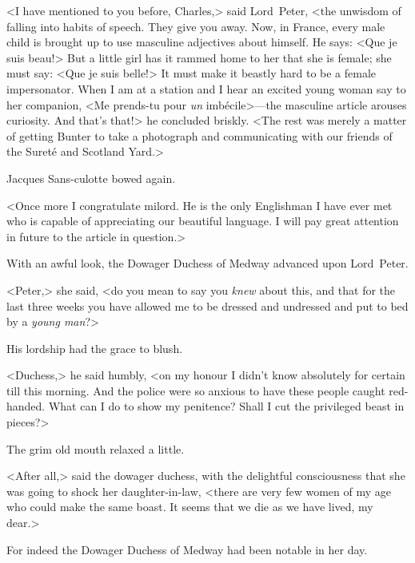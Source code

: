<I have mentioned to you before, Charles,> said Lord~Peter, <the unwisdom of falling into habits of speech. They give you away. Now, in France, every male child is brought up to use masculine adjectives about himself. He says: <Que je suis beau!> But a little girl has it rammed home to her that she is female; she must say: <Que je suis belle!> It must make it beastly hard to be a female impersonator. When I am at a station and I hear an excited young woman say to her companion, <Me prends-tu pour \textit{un} imbécile>—the masculine article arouses curiosity. And that's that!> he concluded briskly. <The rest was merely a matter of getting Bunter to take a photograph and communicating with our friends of the Sureté and Scotland Yard.>

Jacques Sans-culotte bowed again.

<Once more I congratulate milord. He is the only Englishman I have ever met who is capable of appreciating our beautiful language. I will pay great attention in future to the article in question.>

With an awful look, the Dowager Duchess of Medway advanced upon Lord~Peter.

<Peter,> she said, <do you mean to say you \textit{knew} about this, and that for the last three weeks you have allowed me to be dressed and undressed and put to bed by a \textit{young man}?>

His lordship had the grace to blush.

<Duchess,> he said humbly, <on my honour I didn't know absolutely for certain till this morning. And the police were so anxious to have these people caught red-handed. What can I do to show my penitence? Shall I cut the privileged beast in pieces?>

The grim old mouth relaxed a little.

<After all,> said the dowager duchess, with the delightful consciousness that she was going to shock her daughter-in-law, <there are very few women of my age who could make the same boast. It seems that we die as we have lived, my dear.>

For indeed the Dowager Duchess of Medway had been notable in her day.